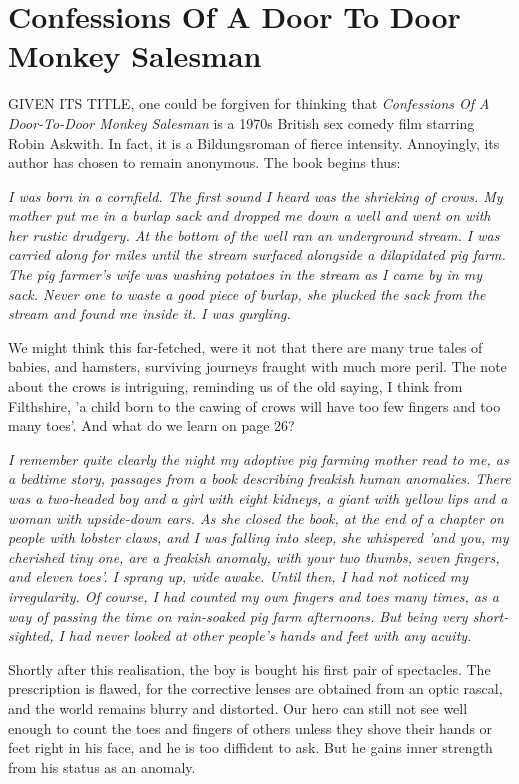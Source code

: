 \chapter{Confessions Of A Door To Door Monkey Salesman}

GIVEN ITS TITLE, one could be forgiven for thinking that \emph{Confessions Of A Door-To-Door Monkey Salesman} is a 1970s British sex comedy film starring Robin Askwith. In fact, it is a Bildungsroman of fierce intensity. Annoyingly, its author has chosen to remain anonymous. The book begins thus:

\emph{I was born in a cornfield. The first sound I heard was the shrieking of crows. My mother put me in a burlap sack and dropped me down a well and went on with her rustic drudgery. At the bottom of the well ran an underground stream. I was carried along for miles until the stream surfaced alongside a dilapidated pig farm. The pig farmer's wife was washing potatoes in the stream as I came by in my sack. Never one to waste a good piece of burlap, she plucked the sack from the stream and found me inside it. I was gurgling.}

We might think this far-fetched, were it not that there are many true tales of babies, and hamsters, surviving journeys fraught with much more peril. The note about the crows is intriguing, reminding us of the old saying, I think from Filthshire, 'a child born to the cawing of crows will have too few fingers and too many toes'. And what do we learn on page 26?

\emph{I remember quite clearly the night my adoptive pig farming mother read to me, as a bedtime story, passages from a book describing freakish human anomalies. There was a two-headed boy and a girl with eight kidneys, a giant with yellow lips and a woman with upside-down ears. As she closed the book, at the end of a chapter on people with lobster claws, and I was falling into sleep, she whispered 'and you, my cherished tiny one, are a freakish anomaly, with your two thumbs, seven fingers, and eleven toes'. I sprang up, wide awake. Until then, I had not noticed my irregularity. Of course, I had counted my own fingers and toes many times, as a way of passing the time on rain-soaked pig farm afternoons. But being very short-sighted, I had never looked at other people's hands and feet with any acuity.}

Shortly after this realisation, the boy is bought his first pair of spectacles. The prescription is flawed, for the corrective lenses are obtained from an optic rascal, and the world remains blurry and distorted. Our hero can still not see well enough to count the toes and fingers of others unless they shove their hands or feet right in his face, and he is too diffident to ask. But he gains inner strength from his status as an anomaly.

